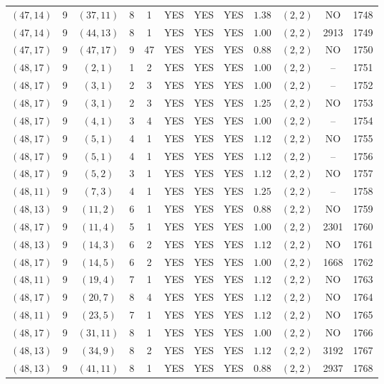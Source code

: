 \begin{longtable}{|c|c|c|c|c|c|c|c|c|c|c|c|}
$(47,14)$ & 9 & $(37,11)$ & 8 & 1 & YES & YES & YES & $1.38$ & $(2,2)$ & NO & 1748\\
$(47,14)$ & 9 & $(44,13)$ & 8 & 1 & YES & YES & YES & $1.00$ & $(2,2)$ & 2913 & 1749\\
$(47,17)$ & 9 & $(47,17)$ & 9 & 47 & YES & YES & YES & $0.88$ & $(2,2)$ & NO & 1750\\
$(48,17)$ & 9 & $(2,1)$ & 1 & 2 & YES & YES & YES & $1.00$ & $(2,2)$ & -- & 1751\\
$(48,17)$ & 9 & $(3,1)$ & 2 & 3 & YES & YES & YES & $1.00$ & $(2,2)$ & -- & 1752\\
$(48,17)$ & 9 & $(3,1)$ & 2 & 3 & YES & YES & YES & $1.25$ & $(2,2)$ & NO & 1753\\
$(48,17)$ & 9 & $(4,1)$ & 3 & 4 & YES & YES & YES & $1.00$ & $(2,2)$ & -- & 1754\\
$(48,17)$ & 9 & $(5,1)$ & 4 & 1 & YES & YES & YES & $1.12$ & $(2,2)$ & NO & 1755\\
$(48,17)$ & 9 & $(5,1)$ & 4 & 1 & YES & YES & YES & $1.12$ & $(2,2)$ & -- & 1756\\
$(48,17)$ & 9 & $(5,2)$ & 3 & 1 & YES & YES & YES & $1.12$ & $(2,2)$ & NO & 1757\\
$(48,11)$ & 9 & $(7,3)$ & 4 & 1 & YES & YES & YES & $1.25$ & $(2,2)$ & -- & 1758\\
$(48,13)$ & 9 & $(11,2)$ & 6 & 1 & YES & YES & YES & $0.88$ & $(2,2)$ & NO & 1759\\
$(48,17)$ & 9 & $(11,4)$ & 5 & 1 & YES & YES & YES & $1.00$ & $(2,2)$ & 2301 & 1760\\
$(48,13)$ & 9 & $(14,3)$ & 6 & 2 & YES & YES & YES & $1.12$ & $(2,2)$ & NO & 1761\\
$(48,17)$ & 9 & $(14,5)$ & 6 & 2 & YES & YES & YES & $1.00$ & $(2,2)$ & 1668 & 1762\\
$(48,11)$ & 9 & $(19,4)$ & 7 & 1 & YES & YES & YES & $1.12$ & $(2,2)$ & NO & 1763\\
$(48,17)$ & 9 & $(20,7)$ & 8 & 4 & YES & YES & YES & $1.12$ & $(2,2)$ & NO & 1764\\
$(48,11)$ & 9 & $(23,5)$ & 7 & 1 & YES & YES & YES & $1.12$ & $(2,2)$ & NO & 1765\\
$(48,17)$ & 9 & $(31,11)$ & 8 & 1 & YES & YES & YES & $1.00$ & $(2,2)$ & NO & 1766\\
$(48,13)$ & 9 & $(34,9)$ & 8 & 2 & YES & YES & YES & $1.12$ & $(2,2)$ & 3192 & 1767\\
$(48,13)$ & 9 & $(41,11)$ & 8 & 1 & YES & YES & YES & $0.88$ & $(2,2)$ & 2937 & 1768\\

\end{longtable}
